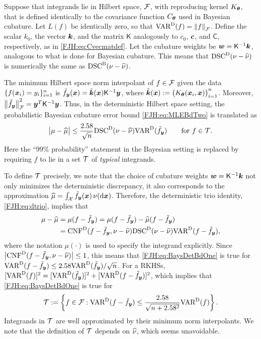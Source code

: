 \documentclass[graybox,footinfo]{svmult}
\begin{document}
Suppose that integrands lie in Hilbert space,  ${\mathcal{F}}$, with reproducing kernel 
$K_{\boldsymbol{\theta}}$, that is defined identically to the covariance function 
$C_{\boldsymbol{\theta}}$ used in Bayesian cubature.  Let $L(f)$ be identically zero, 
so that $\textup{VAR}^{\textup{D}}(f) = \left \lVert f \right \rVert_{{\mathcal{F}}}$.  Define the scalar $k_0$, the vector ${\boldsymbol{k}}$, 
and the matrix $\mathsf{K}$ analogously to $c_0$, ${\boldsymbol{c}}$, and $\mathsf{C}$, 
respectively, as in  \eqref{FJH:eq:Cvecmatdef}.  Let the cubature weights be ${\boldsymbol{w}} = 
\mathsf{K}^{-1} {\boldsymbol{k}}$, analogous to what is done for Bayesian cubature.  This means 
that $\textup{DSC}^{\textup{D}}(\nu - \widehat{\nu})$ is numerically the same as $\textup{DSC}^{\textup{B}}(\nu - \widehat{\nu})$.

\begin{FJHLesson}
	\FJHLessonFourteen
\end{FJHLesson}

The minimum Hilbert space norm 
interpolant of $f \in {\mathcal{F}}$ given the data $ \{f({\boldsymbol{x}}_i )= y_i\}_{i=1}^n$ is $\tilde{f}_{\boldsymbol{y}}({\boldsymbol{x}}) = 
\tilde{{\boldsymbol{k}}}({\boldsymbol{x}}) \mathsf{K}^{-1} {\boldsymbol{y}}$, where $\tilde{{\boldsymbol{k}}}({\boldsymbol{x}}) := 
\bigl( K_{\boldsymbol{\theta}}({\boldsymbol{x}}_i,{\boldsymbol{x}}) \bigr)_{i=1}^n$.  Moreover, $\left \lVert \tilde{f}_{\boldsymbol{y}} \right \rVert^2_{{\mathcal{F}}} = 
{\boldsymbol{y}}^T 
\mathsf{K}^{-1} {\boldsymbol{y}}$.  Thus, in the deterministic Hilbert space setting, the probabilistic 
Bayesian cubature error bound \eqref{FJH:eq:MLEBdTwo} is translated as
\begin{equation} \label{FJH:eq:BaysDetBdOne}
\abs{\mu - \hmu} \le \frac{2.58}{\sqrt{n}} \disc^{\Dt}(\nu - \hnu) \Var^{\Dt}(\tf_\bsy)  
\qquad \text{for } f\in \calT.
\end{equation}
Here the ``$99\%$ probability'' statement in the Bayesian setting is replaced by requiring 
$f$ to lie in a set ${\mathcal{T}}$ of \emph{typical} integrands. 

To define ${\mathcal{T}}$ precisely, we note that the choice of cubature weights ${\boldsymbol{w}} = 
\mathsf{K}^{-1} {\boldsymbol{k}}$ not only minimizes the deterministic discrepancy, it also 
corresponds to the approximation $\widehat{\mu}= \int_{{\mathcal{X}}} \tilde{f}_{\boldsymbol{y}}({\boldsymbol{x}}) \, \nu(\mathrm{d} {\boldsymbol{x}})$.  
Therefore, the deterministic trio identity, \eqref{FJH:eq:dtrio}, implies that  
\begin{align*}
\mu - \widehat{\mu} & = \mu(f - \tilde{f}_{\boldsymbol{y}}) = \mu(f - \tilde{f}_{\boldsymbol{y}}) - \widehat{\mu}(f - \tilde{f}_{\boldsymbol{y}}) \\
& = \textup{CNF}^{\textup{D}}(f - 
\tilde{f}_{\boldsymbol{y}},\nu - \widehat{\nu}) \textup{DSC}^{\textup{D}}(\nu - \widehat{\nu}) \textup{VAR}^{\textup{D}}(f - \tilde{f}_{\boldsymbol{y}}),
\end{align*}
where the notation $\mu(\cdot)$ is used to specify the integrand explicitly. Since 
$\bigl \lvert \textup{CNF}^{\textup{D}}(f - 
	\tilde{f}_{\boldsymbol{y}},\nu - \widehat{\nu}) \bigr \rvert \le 1$, this means that \eqref{FJH:eq:BaysDetBdOne} is true for 
	$\textup{VAR}^{\textup{D}}(f - \tilde{f}_{\boldsymbol{y}}) \le 2.58 \textup{VAR}^{\textup{D}}(\tilde{f}_{\boldsymbol{y}}) /\sqrt{n}$. For a
RKHSs, $[\textup{VAR}^{\textup{D}}(f)]^2 = [\textup{VAR}^{\textup{D}}(\tilde{f}_{\boldsymbol{y}})]^2 + 
[\textup{VAR}^{\textup{D}}(f - \tilde{f}_{\boldsymbol{y}})]^2$, which implies that \eqref{FJH:eq:BaysDetBdOne} is true for 
\begin{equation*}
{\mathcal{T}} := \left \{f \in {\mathcal{F}} : \textup{VAR}^{\textup{D}}(f - \tilde{f}_{\boldsymbol{y}}) \le \frac{2.58}{\sqrt{n + 2.58^2}} 
\textup{VAR}^{\textup{D}}(f) 
\right\} .
\end{equation*}
Integrands in ${\mathcal{T}}$ are well approximated by their minimum norm interpolants.  We 
note that the definition of ${\mathcal{T}}$ 
depends on $\widehat{\nu}$, which seems unavoidable.
\end{document}
